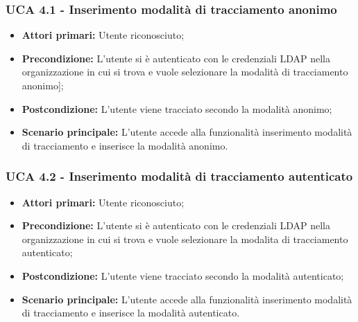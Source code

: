 \subsubsection{UCA 4.1 - Inserimento modalità di tracciamento anonimo}%
\begin{itemize}
\item \textbf{Attori primari:} Utente riconosciuto;
\item \textbf{Precondizione:} L'utente si è autenticato con le credenziali LDAP nella organizzazione in cui si trova e vuole selezionare la modalità di tracciamento anonimo];
\item \textbf{Postcondizione:} L'utente viene tracciato secondo la modalità anonimo;
\item \textbf{Scenario principale:} L'utente accede alla funzionalità inserimento modalità di tracciamento e inserisce la modalità anonimo.
\end{itemize}

\subsubsection{UCA 4.2 - Inserimento modalità di tracciamento autenticato}%
\begin{itemize}
	\item \textbf{Attori primari:} Utente riconosciuto;
	\item \textbf{Precondizione:} L'utente si è autenticato con le credenziali LDAP nella organizzazione in cui si trova e vuole selezionare la modalita di tracciamento autenticato;
	\item \textbf{Postcondizione:} L'utente viene tracciato secondo la modalità autenticato;
	\item \textbf{Scenario principale:} L'utente accede alla funzionalità inserimento modalità di tracciamento e inserisce la modalità autenticato.
\end{itemize}
